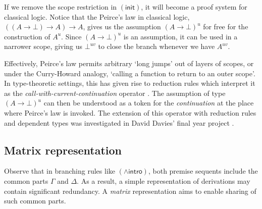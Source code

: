 \documentclass[twoside]{report}
\begin{document}
If we remove the scope restriction in $(\mathsf{init})$, it will become a proof system for classical logic. Notice that the Peirce's law in classical logic, $((A \to \bot) \to A) \to A$, gives us the assumption $(A \to \bot)^u$ for free for the construction of $A^u$. Since $(A \to \bot)^u$ is an assumption, it can be used in a narrower scope, giving us $\bot^{uv}$ to close the branch whenever we have $A^{uv}$.

Effectively, Peirce's law permits arbitrary `long jumps' out of layers of scopes, or under the Curry-Howard analogy, `calling a function to return to an outer scope'. In type-theoretic settings, this has given rise to reduction rules which interpret it as the \emph{call-with-current-continuation} operator \cite{griffin1989formulae}. The assumption of type $(A \to \bot)^u$ can then be understood as a token for the \emph{continuation} at the place where Peirce's law is invoked. The extension of this operator with reduction rules and dependent types was investigated in David Davies' final year project \cite{david2021theorem}.

\subsection*{Matrix representation}

\newcommand{\mat}[1]{\begin{bmatrix}#1\end{bmatrix}}

Observe that in branching rules like $(\land\mathsf{intro})$, both premise sequents include the common parts $\Gamma$ and $\Delta$. As a result, a simple representation of derivations may contain significant redundancy. A \emph{matrix} representation \cite{andrews1981theorem,bibel1981matrices,waaler2001connections} aims to enable sharing of such common parts.
\end{document}
